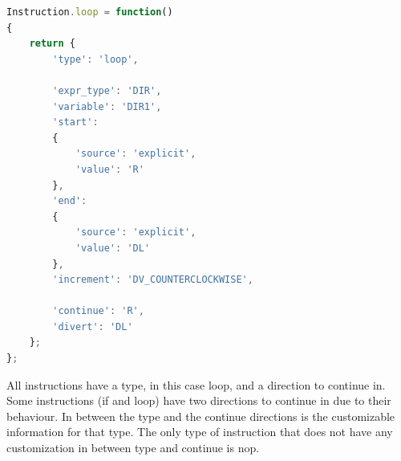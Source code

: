 \begin{lstlisting}[language=javascript]
Instruction.loop = function()
{
	return {
		'type': 'loop',

		'expr_type': 'DIR',
		'variable': 'DIR1',
		'start':
		{
			'source': 'explicit',
			'value': 'R'
		},
		'end':
		{
			'source': 'explicit',
			'value': 'DL'
		},
		'increment': 'DV_COUNTERCLOCKWISE',
		
		'continue': 'R',
		'divert': 'DL'
	};
};
\end{lstlisting}

All instructions have a type, in this case loop, and a direction to continue in. Some instructions (if and loop) have two directions to continue in due to their behaviour. In between the type and the continue directions is the customizable information for that type. The only type of instruction that does not have any customization in between type and continue is nop.